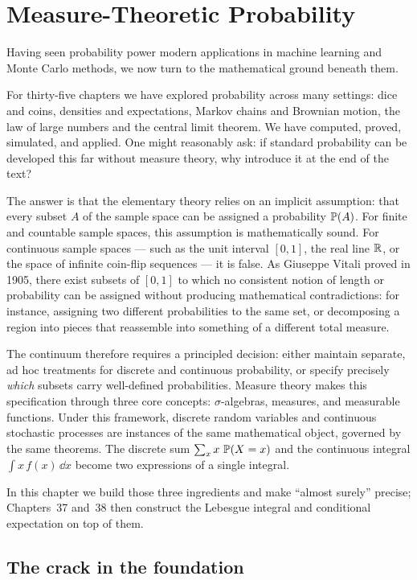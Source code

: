 \chapter{Measure-Theoretic Probability}

Having seen probability power modern applications in machine learning and Monte Carlo methods,
we now turn to the mathematical ground beneath them.

For thirty-five chapters we have explored probability across many settings:
dice and coins, densities and expectations, Markov chains and Brownian
motion, the law of large numbers and the central limit theorem. We have computed,
proved, simulated, and applied. One might reasonably ask: if standard probability
can be developed this far without measure theory, why introduce it at the end of the text?

The answer is that the elementary theory relies on an implicit assumption: that
every subset $A$ of the sample space can be assigned a probability $\P(A)$. For
finite and countable sample spaces, this assumption is mathematically sound. For
continuous sample spaces --- such as the unit interval $[0,1]$, the real line $\R$,
or the space of infinite coin-flip sequences --- it is false. As Giuseppe Vitali
proved in 1905, there exist subsets of $[0,1]$ to which no consistent notion of
length or probability can be assigned without producing mathematical contradictions:
for instance, assigning two different probabilities to the same set, or decomposing
a region into pieces that reassemble into something of a different total measure.

The continuum therefore requires a principled decision: either maintain separate,
ad hoc treatments for discrete and continuous probability, or specify precisely
\emph{which} subsets carry well-defined probabilities. Measure theory makes this
specification through three core concepts: $\sigma$-algebras, measures, and
measurable functions. Under this framework, discrete random variables and continuous
stochastic processes are instances of the same mathematical object, governed by
the same theorems. The discrete sum $\sum_x x\,\P(X=x)$ and the continuous integral
$\int x\,f(x)\,\dd x$ become two expressions of a single integral.

In this chapter we build those three ingredients and make ``almost surely'' precise;
Chapters~37 and~38 then construct the Lebesgue integral and conditional expectation on
top of them.

\section{The crack in the foundation}
\label{ch36:crack}

